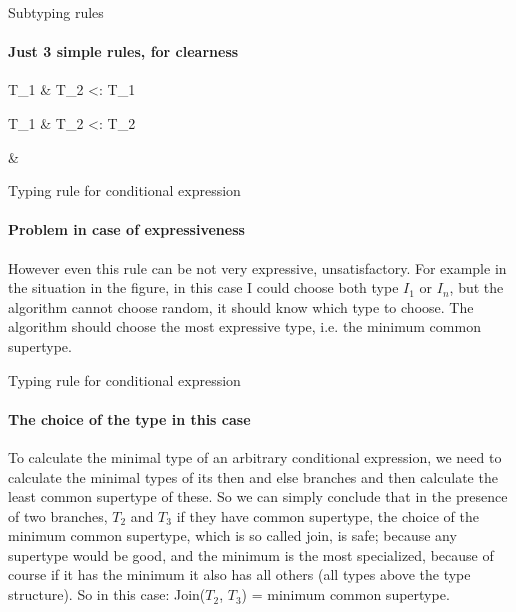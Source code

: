 \documentclass{beamer}
\begin{document}
\begin{frame}{Subtyping rules}
	\framesubtitle{Just 3 simple rules, for clearness}
	\begin{flalign*}T_1 \& T_2 <: T_1\end{flalign*}
		\begin{flalign*}T_1 \& T_2 <: T_2\end{flalign*}
	  \begin{flalign*}
	& 
	\end{flalign*}
\end{frame}

\begin{frame}{Typing rule for conditional expression}
\framesubtitle{Problem in case of expressiveness}
However even this rule can be not very expressive, unsatisfactory.
\newline For example in the situation in the figure, in this case I could choose both type $I_1$ or $I_n$, but the algorithm cannot choose random, it should know which type to choose. \newline
The algorithm should choose the most expressive type, i.e. the minimum common supertype.
\begin{center}
\end{center}
\end{frame}

\begin{frame}{Typing rule for conditional expression}
\framesubtitle{The choice of the type in this case}
To calculate the minimal type of an arbitrary conditional expression, we need to calculate the minimal types of its then and else branches and then calculate the least common supertype of these. \newline
So we can simply conclude that in the presence of two branches, $T_2$ and $T_3$ if they have common supertype, the choice of the minimum common supertype, which is so called join, is safe; because any supertype would be good, and the minimum is the most specialized, because of course if it has the minimum it also has all others (all types above the type structure).    \newline\newline
So in this case: \newline Join($T_2$, $T_3$) = minimum common supertype.
\end{frame}
\end{document}
